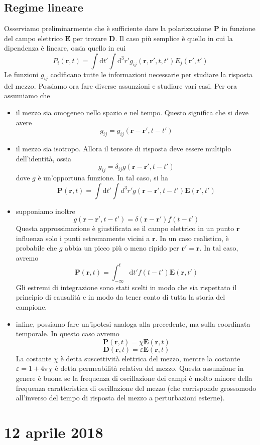 \documentclass[a4paper,11pt]{book}
\renewcommand{\d}{\mathrm{d}}
\renewcommand{\vec}[1]{\mathbf{#1}}
\theoremstyle{theorem}
\theoremstyle{definition}
\begin{document}
 \subsection{Regime lineare}
 Osserviamo preliminarmente che è sufficiente dare la polarizzazione $\vec{P}$ in funzione del campo elettrico $\vec{E}$ per trovare $\vec{D}$. Il caso più semplice è quello in cui la dipendenza è lineare, ossia quello in cui
 \[P_i(\vec{r},t)=\int\d t'\int\d^3r'g_{ij}(\vec{r},\vec{r}',t,t')E_j(\vec{r}',t')\]
 Le funzioni $g_{ij}$ codificano tutte le informazioni necessarie per studiare la risposta del mezzo. Possiamo ora fare diverse assunzioni e studiare vari casi. Per ora assumiamo che
 \begin{itemize}
 	\item il mezzo sia omogeneo nello spazio e nel tempo. Questo significa che si deve avere
 	\[g_{ij}=g_{ij}(\vec{r}-\vec{r}',t-t')\]
 	\item il mezzo sia isotropo. Allora il tensore di risposta deve essere multiplo dell'identità, ossia
 	\[g_{ij}=\delta_{ij}g(\vec{r}-\vec{r}',t-t')\]
 	dove $g$ è un'opportuna funzione. In tal caso, si ha
 	\[\vec{P}(\vec{r},t)=\int\d t'\int d^3r'g(\vec{r}-\vec{r}',t-t')\vec{E}(\vec{r}',t')\]
 	\item supponiamo inoltre \[g(\vec{r}-\vec{r}',t-t')=\delta(\vec{r}-\vec{r}')f(t-t')\]
 	Questa approssimazione è giustificata se il campo elettrico in un punto $\vec{r}$ influenza solo i punti estremamente vicini a $\vec{r}$. In un caso realistico, è probabile che $g$ abbia un picco più o meno ripido per $\vec{r}'=\vec{r}$. In tal caso, avremo
 	\[\vec{P}(\vec{r},t)=\int_{-\infty}^{t}\d t'f(t-t')\vec{E}(\vec{r},t')\]
 	Gli estremi di integrazione sono stati scelti in modo che sia rispettato il principio di causalità e in modo da tener conto di tutta la storia del campione.
 	\item infine, possiamo fare un'ipotesi analoga alla precedente, ma sulla coordinata temporale. In questo caso avremo
 	\[\vec{P}(\vec{r},t)=\chi\vec{E}(\vec{r},t)\]
 	\[\vec{D}(\vec{r},t)=\varepsilon\vec{E}(\vec{r},t)\]
 	La costante $\chi$ è detta suscettività elettrica del mezzo, mentre la costante $\varepsilon=1+4\pi\chi$ è detta permeabilità relativa del mezzo. Questa assunzione in genere è buona se la frequenza di oscillazione dei campi è molto minore della frequenza caratteristica di oscillazione del mezzo (che corrisponde grossomodo all'inverso del tempo di risposta del mezzo a perturbazioni esterne).
 \end{itemize}
\newpage
\section{12 aprile 2018}
\end{document}
